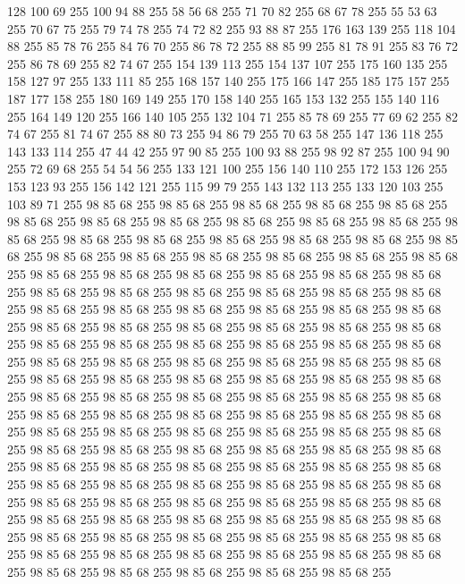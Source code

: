 128 100 69 255 100 94 88 255 58 56 68 255 71 70 82 255 68 67 78 255 55 53 63 255 70 67 75 255 79 74 78 255 74 72 82 255 93 88 87 255 176 163 139 255 118 104 88 255 85 78 76 255 84 76 70 255 86 78 72 255 88 85 99 255 81 78 91 255 83 76 72 255 86 78 69 255 82 74 67 255 154 139 113 255 154 137 107 255 175 160 135 255 158 127 97 255 133 111 85 255 168 157 140 255 175 166 147 255 185 175 157 255 187 177 158 255 180 169 149 255 170 158 140 255 165 153 132 255 155 140 116 255 164 149 120 255 166 140 105 255 132 104 71 255 85 78 69 255 77 69 62 255 82 74 67 255 81 74 67 255 88 80 73 255 94 86 79 255 70 63 58 255 147 136 118 255 143 133 114 255 47 44 42 255 97 90 85 255 100 93 88 255 98 92 87 255 100 94 90 255 72 69 68 255 54 54 56 255 133 121 100 255 156 140 110 255 172 153 126 255 153 123 93 255 156 142 121 255 115 99 79 255 143 132 113 255 133 120 103 255 103 89 71 255 98 85 68 255 98 85 68 255 98 85 68 255
98 85 68 255 98 85 68 255 98 85 68 255 98 85 68 255 98 85 68 255 98 85 68 255 98 85 68 255 98 85 68 255 98 85 68 255 98 85 68 255 98 85 68 255 98 85 68 255 98 85 68 255 98 85 68 255 98 85 68 255 98 85 68 255 98 85 68 255 98 85 68 255 98 85 68 255 98 85 68 255 98 85 68 255 98 85 68 255 98 85 68 255 98 85 68 255 98 85 68 255 98 85 68 255 98 85 68 255 98 85 68 255 98 85 68 255 98 85 68 255 98 85 68 255 98 85 68 255 98 85 68 255 98 85 68 255 98 85 68 255 98 85 68 255 98 85 68 255 98 85 68 255 98 85 68 255 98 85 68 255 98 85 68 255 98 85 68 255 98 85 68 255 98 85 68 255 98 85 68 255 98 85 68 255 98 85 68 255 98 85 68 255 98 85 68 255 98 85 68 255 98 85 68 255 98 85 68 255 98 85 68 255 98 85 68 255 98 85 68 255 98 85 68 255 98 85 68 255 98 85 68 255 98 85 68 255 98 85 68 255 98 85 68 255 98 85 68 255 98 85 68 255 98 85 68 255
98 85 68 255 98 85 68 255 98 85 68 255 98 85 68 255 98 85 68 255 98 85 68 255 98 85 68 255 98 85 68 255 98 85 68 255 98 85 68 255 98 85 68 255 98 85 68 255 98 85 68 255 98 85 68 255 98 85 68 255 98 85 68 255 98 85 68 255 98 85 68 255 98 85 68 255 98 85 68 255 98 85 68 255 98 85 68 255 98 85 68 255 98 85 68 255 98 85 68 255 98 85 68 255 98 85 68 255 98 85 68 255 98 85 68 255 98 85 68 255 98 85 68 255 98 85 68 255 98 85 68 255 98 85 68 255 98 85 68 255 98 85 68 255 98 85 68 255 98 85 68 255 98 85 68 255 98 85 68 255 98 85 68 255 98 85 68 255 98 85 68 255 98 85 68 255 98 85 68 255 98 85 68 255 98 85 68 255 98 85 68 255 98 85 68 255 98 85 68 255 98 85 68 255 98 85 68 255 98 85 68 255 98 85 68 255 98 85 68 255 98 85 68 255 98 85 68 255 98 85 68 255 98 85 68 255 98 85 68 255 98 85 68 255 98 85 68 255 98 85 68 255 98 85 68 255
